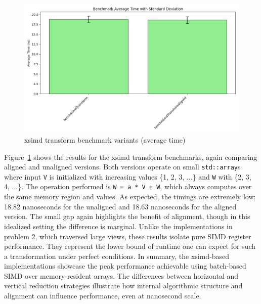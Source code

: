 \begin{figure}[h!]
    \centering
    \includegraphics[width=0.9\linewidth]{img/simd_transformVX_output.txt_ex02.png}
    \caption{xsimd transform benchmark variants (average time)}
    \label{fig:simd_transformVX_output}
\end{figure}

Figure~\ref{fig:simd_transformVX_output} shows the results for the xsimd transform benchmarks, again comparing aligned and unaligned versions.
Both versions operate on small \texttt{std::array}s where input \texttt{V} is initialized with increasing values \{1, 2, 3, ...\} and \texttt{W} with \{2, 3, 4, ...\}.
The operation performed is \texttt{W = a * V + W}, which always computes over the same memory region and values.
As expected, the timings are extremely low: 18.82 nanoseconds for the unaligned and 18.63 nanoseconds for the aligned version.
The small gap again highlights the benefit of alignment, though in this idealized setting the difference is marginal.
Unlike the implementations in problem 2, which traversed large views, these results isolate pure SIMD register performance.
They represent the lower bound of runtime one can expect for such a transformation under perfect conditions.
In summary, the xsimd-based implementations showcase the peak performance achievable using batch-based SIMD over memory-resident arrays.
The differences between horizontal and vertical reduction strategies illustrate how internal algorithmic structure and alignment can influence performance, even at nanosecond scale.



